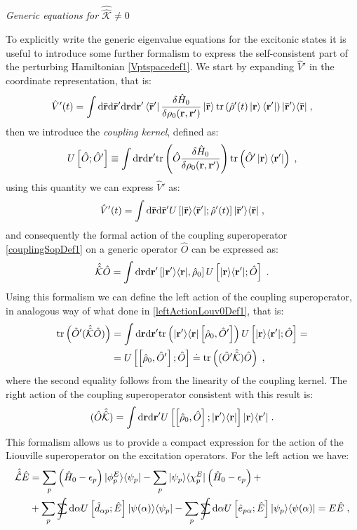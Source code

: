 \documentclass[a4paper]{article}
\newcommand{\dd}{{\rm d}}
\renewcommand{\r}{{\bf r}}
\newcommand{\br}{\bar{\bf r}}
\newcommand{\eps}{\epsilon}
\newcommand{\sint}{\mathrlap{\displaystyle\int}
\mathrlap{\textstyle\sum}
\phantom{\mathrlap{\displaystyle
\int}\textstyle\sum}}
\newcommand{\be}{\begin{equation}}
\newcommand{\ee}{\end{equation}}
\newcommand{\nn}{\notag}
\newcommand{\lb}{\label}
\newcommand{\op}[1]{\hat {#1}}
\newcommand{\sop}[1]{\op{\op {#1}}}
\newcommand{\commutator}[2]{\left[ {#1} , {#2} \right]}
\newcommand{\trace}[1]{\mathrm{tr}\left(#1\right)}
\newcommand{\ketbra}[2]{| #1 \rangle \langle #2 |}
\newcommand{\dmnot}{\op{\rho}_0}
\newcommand{\dm}{\op{\rho}}
\newcommand{\hnot}{\op{H}_0}
\newcommand{\excite}[2]{\op e_{{#1}{#2}}}
\newcommand{\decay}[2]{\op d_{{#1}{#2}}}
\newcommand{\Liouv}{\sop{\mathcal L}}
\newcommand{\coupl}{\sop{\mathcal K}}
\begin{document}
\vspace{0.5cm}
\emph{Generic equations for $\coupl \neq 0$}
\vspace{0.5cm}

To explicitly write the generic eigenvalue equations for the excitonic states it is useful to introduce some further formalism to express the 
self-consistent part of the perturbing Hamiltonian \eqref{Vptspacedef1}. We start by expanding $\op V'$ in the coordinate representation, that is:
\be
\op V'(t)= 
\int \dd \br \dd \br' \dd \r \dd \r' \bra{\br'}\frac{\delta\hnot}{\delta \rho_0(\r,\r')}\ket{\br}
\trace{\dm'(t) \ket{\r} \bra{\r'}} \ketbra{\br'}{\br}\;, \nn
\ee
then we introduce the \emph{coupling kernel}, defined as:
\be\lb{couplingKernelDef1}
U\left[\op O; \op O'\right] \equiv  \int \dd \r \dd \r' \trace{\op O \frac{\delta \hnot }{\delta \rho_0(\r,\r')}
} \trace{\op O' \ket{\r} \bra{\r'}} \;,
\ee
using this quantity we can express $\op V'$ as:
\be\lb{Vptspacedef2}
\op V'(t)= 
\int \dd \br \dd \br' U\left[\ketbra{\br}{\br'};\dm'(t)\right] \ketbra{\br'}{\br}\;,
\ee
and consequently the formal action of the coupling superoperator \eqref{couplingSopDef1} on a generic operator $\op O$ can be expressed as: 
\be\lb{couplingSopDef2}
\coupl\op O = 
\int \dd \r \dd \r' \commutator{\ketbra{\r'}{\r}}{\dmnot} U\left[\ketbra{\r}{\r'};\op O\right] \;.
\ee
Using this formalism we can define the left action of the coupling superoperator, in analogous way of what done in \eqref{leftActionLouv0Def1}, 
that is:
\begin{align}\lb{leftActionCouplingDef1}
\trace{\op O' (\coupl \op O)} &= \int \dd\r\dd\r'\trace{\ketbra{\r'}{\r}\commutator{\dmnot}{\op O'}}
U\left[\ketbra{\r}{\r'};\op O\right]  = \nn \\ &= 
U\left[\commutator{\dmnot}{\op O'};\op O\right] \doteq \trace{(\op O' \coupl) \op O } \;,
\end{align}
where the second equality follows from the linearity of the coupling kernel. The right action of the coupling superoperator consistent with this result is:
\be\lb{leftActionCouplingDef2}
(\op O \coupl) = \int \dd\r\dd\r'
U\left[\commutator{\dmnot}{\op O};\ketbra{\r'}{\r}\right]\ketbra{\r}{\r'} \;.
\ee
This formalism allows us to provide a compact expression for the action of the Liouville superoperator on the excitation operators. For the left action we have:
\begin{align}
\Liouv\op E &= \sum_p\left(\hnot-\eps_p\right)\ketbra{\phi^E_p}{\psi_p} - \sum_p\ketbra{\psi_p}{\chi^E_p}\left(\hnot-\eps_p\right) + \nn \\
&+ \sum_p \sint \dd\alpha  U\left[\decay{\alpha}{p}; \op E\right] \ketbra{\psi(\alpha)}{\psi_p}
- \sum_p \sint \dd\alpha U\left[\excite{p}{\alpha}; \op E\right] \ketbra{\psi_p}{\psi(\alpha)} = E\op E \;, \nn
\end{align}
\end{document}
